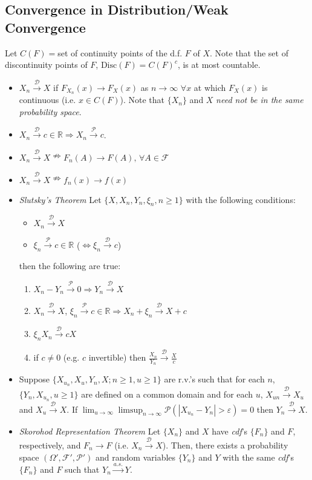 \documentclass[11pt]{article}
\newcommand{\bbr}{\mathbb{R}}
\renewcommand{\P}{\mathbb{P}}
\newcommand{\fcal}{\mathcal{F}}
\newcommand{\eps}{\varepsilon}
\newcommand{\Go}{\Omega}
\newcommand\abs[1]{\left|#1\right|}
\renewcommand{\to}{\longrightarrow}
\newcommand{\asto}{\overset{a.s.}{\to}}
\newcommand{\pto}{\overset{\P}{\to}}
\newcommand{\dto}{\overset{\mathcal{D}}{\to}}
\renewcommand{\P}{\mathcal{P}}
\newcommand{\gx}{\xi}
\newcommand{\imp}{\Rightarrow}
\newcommand{\nimp}{\nRightarrow}
\newcommand{\seq}[1]{\{#1\}}
\begin{document}
\begin{multicols}{2}
\subsection{Convergence in Distribution/Weak Convergence}
Let $C(F)=$set of continuity points of the d.f. $F$ of $X$.  Note that the set of discontinuity points of $F$, $\textrm{Disc}(F)=C(F)^{c}$, is at most countable.
\begin{itemize}
\item $X_n \dto X$  if $F_{X_n}(x) \to F_X(x)$ as $n \to \infty$ $\forall x$ at which $F_X(x)$ is continuous (i.e. $x \in C(F)$).  Note that $\seq{X_n}$ and $X$ \textit{need not be in the same probability space}.
\item $X_n \dto c \in \bbr \imp X_n \pto c$.
\item $X_n \dto X \nimp F_n(A) \to F(A), \, \forall A \in \fcal$
\item $X_n \dto X \nimp f_n(x) \to f(x)$
\item \textit{Slutsky's Theorem} Let $\{X, X_n, Y_n, \gx_n, n \geq1\}$ with the following conditions:
\begin{itemize}
\item $X_n \dto X$
\item $\gx_n \pto c \in \bbr$ ($\iff \gx_n \dto c$)
\end{itemize} then the following are true:
\begin{enumerate}
\item $X_n-Y_n \pto 0 \imp Y_n \dto X$
\item $X_n \dto X$, $\gx_n \pto c\in \bbr \imp X_n+\gx_n \dto X+c$
\item $\gx_n X_n \dto cX$
\item if $c \neq 0$ (e.g. $c$ invertible) then $\frac{X_n}{Y_n}\dto \frac{X}{c}$
\end{enumerate}
\item Suppose $\{X_{u_n},X_u,Y_n,X; n \geq 1, u \geq 1\}$ are r.v.'s such that for each $n$, $\{Y_n, X_{u_n}, u \geq 1\}$ are defined on a common domain and for each $u$, $X_{un}\dto X_u$ and $X_u \dto X$.  If $\lim_{u \to \infty}\limsup_{n \to \infty} \P(\abs{X_{u_n}-Y_n}>\eps ) =0$ then $Y_n \dto X$.
\item \textit{Skorohod Representation Theorem} Let $\seq{X_n}$ and $X$ have \textit{cdf}'s $\seq{F_n}$ and $F$, respectively, and $F_n \to F$ (i.e. $X_n \dto X$).  Then, there exists a probability space $(\Go',\fcal',\P')$ and random variables $\seq{Y_n}$ and $Y$ with the same \textit{cdf}'s $\seq{F_n}$ and $F$ such that $Y_n \asto Y$.

\end{itemize}
\end{multicols}
\end{document}
